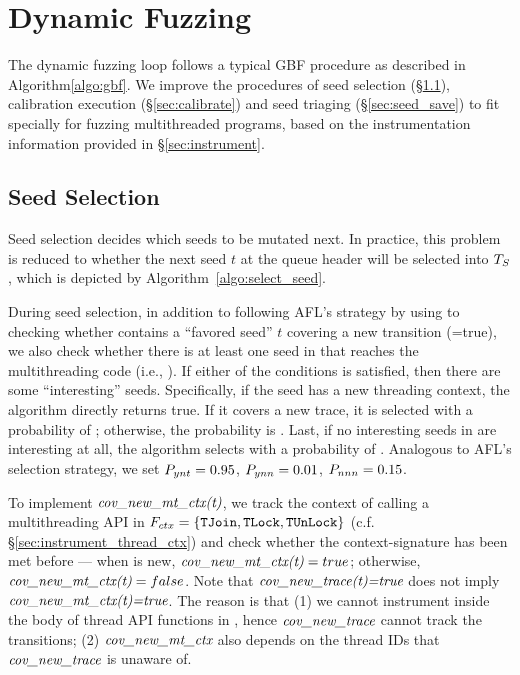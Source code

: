 
\section{Dynamic Fuzzing}\label{sec:fuzz}
The dynamic fuzzing loop follows a typical GBF procedure as described in Algorithm\ref{algo:gbf}. We improve the procedures of seed selection (\S\ref{sec:seed_select}),
calibration execution (\S\ref{sec:calibrate}) and seed triaging (\S\ref{sec:seed_save}) to fit specially for fuzzing multithreaded programs, based on the instrumentation information provided in \S\ref{sec:instrument}.

\subsection{Seed Selection}\label{sec:seed_select}

Seed selection decides which seeds to be mutated next. In practice, this problem is reduced to whether the next seed $t$ at the queue header will be selected into $T_{S}$, which is depicted by Algorithm~\ref{algo:select_seed}.






During seed selection, in addition to following AFL's strategy by using  to checking whether \Seeds contains a ``favored seed'' $t$ covering a new transition (=true), we also check whether there is at least one seed in \Seeds that reaches the multithreading code (i.e., ). If either of the conditions is satisfied, then there are some ``interesting'' seeds.
Specifically, if the seed has a new threading context, the algorithm directly returns  true. If it covers a new trace, it is selected with a probability of \probYNT; otherwise, the probability is \probYNN. Last, if no interesting seeds in \Seeds are interesting at all, the algorithm selects with a probability of \probNNN. Analogous to AFL's selection strategy, we set $P_{ynt}=0.95$, $P_{ynn}=0.01$, $P_{nnn}=0.15$.

To implement $\emph{cov\_new\_mt\_ctx(t)}$, we track the context of calling a multithreading API in $F_{ctx}=\{\texttt{TJoin}, \texttt{TLock}, \texttt{TUnLock}\}$ (c.f. \S\ref{sec:instrument_thread_ctx}) and check whether the  context-signature \tctxSign has been met before ---  when \tctxSign is new, $\emph{cov\_new\_mt\_ctx(t)}=true$; otherwise, $\emph{cov\_new\_mt\_ctx(t)}=false$. Note that $\emph{cov\_new\_trace(t)=true}$ does not imply $\emph{cov\_new\_mt\_ctx(t)=true}$. The reason is that (1) we cannot instrument inside the body of thread API functions in \FSThread, hence $\emph{cov\_new\_trace}$ cannot track the transitions; (2) $\emph{cov\_new\_mt\_ctx}$ also depends on the thread IDs that $\emph{cov\_new\_trace}$ is unaware of.  




